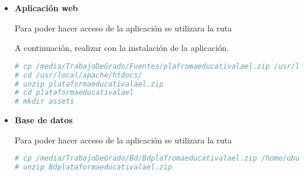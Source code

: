 \begin{itemize}

\item \textbf{Aplicación web}

Para poder hacer acceso de la aplicación se utilizara la ruta 

A continuación, realizar con la instalación de la aplicación.

\begin{lstlisting}[language=bash, caption={}]
# cp /media/TrabajoDeGrado/Fuentes/plafromaeducativalael.zip /usr/local/apache/htdocs/
# cd /usr/local/apache/htdocs/
# unzip plataformaeducativalael.zip
# cd plataformaeducativalael
# mkdir assets
\end{lstlisting}

\item \textbf{Base de datos}

Para poder hacer acceso de la aplicación se utilizara la ruta 

\begin{lstlisting}[language=bash, caption={}]
# cp /media/TrabajoDeGrado/Bd/Bdplafromaeducativalael.zip /home/ubuntu
# unzip Bdplataformaeducativalael.zip
\end{lstlisting}


\end{itemize}
